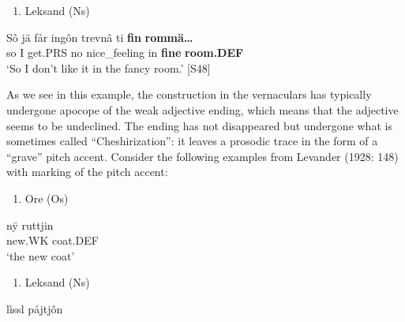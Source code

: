 \begin{enumerate} %
\item 
\label{bkm:Ref140985874}Leksand (Ns)

\end{enumerate} %
\ea\label{}
\gll Sô  jä  får  ingôn  trevnâ  ti  \textbf{fin} \textbf{rommä…}\\


so  I  get.PRS  no  nice\_feeling  in  \textbf{fine} \textbf{room.DEF}\\ %


‘So I don’t like it in the fancy room.’ [S48]
\z

As we see in this example, the construction in the vernaculars has typically undergone apocope of the weak adjective ending, which means that the adjective seems to be undeclined. The ending has not disappeared but undergone what is sometimes called “Cheshirization”: it leaves a prosodic trace in the form of a “grave” pitch accent. Consider the following examples from Levander (1928: 148) with marking of the pitch accent:

\begin{enumerate} %
\item 
Ore (Os)

\end{enumerate} %
\ea\label{}
\gll n\={y}{\textasciigrave}  ruttjin\\


new.WK  coat.DEF\\ %


‘the new coat’
\z


\begin{enumerate} %
\item 
Leksand (Ns)

\end{enumerate} %
\ea\label{}
\gll lìssl  påjtjôn\\


